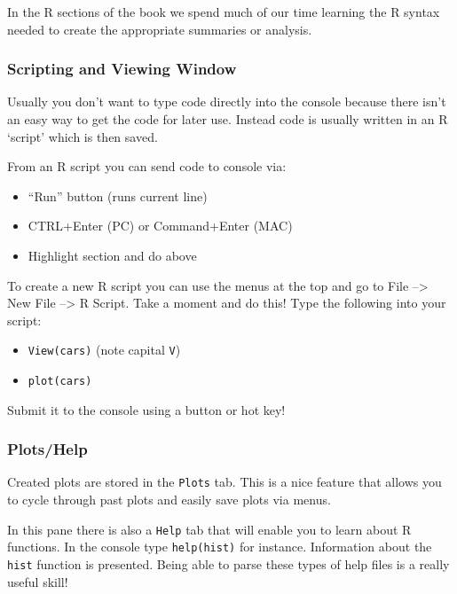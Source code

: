 \documentclass[
]{book}
\theoremstyle{definition}
\theoremstyle{definition}
\theoremstyle{definition}
\theoremstyle{remark}
\begin{document}
In the R sections of the book we spend much of our time learning the R syntax needed to create the appropriate summaries or analysis.

\hypertarget{scripting-and-viewing-window-1}{%
\subsubsection{Scripting and Viewing Window}\label{scripting-and-viewing-window-1}}

Usually you don't want to type code directly into the console because there isn't an easy way to get the code for later use. Instead code is usually written in an R `script' which is then saved.

From an R script you can send code to console via:

\begin{itemize}
\item
  ``Run'' button (runs current line)
\item
  CTRL+Enter (PC) or Command+Enter (MAC)
\item
  Highlight section and do above
\end{itemize}

To create a new R script you can use the menus at the top and go to File --\textgreater{} New File --\textgreater{} R Script. Take a moment and do this! Type the following into your script:

\begin{itemize}
\item
  \texttt{View(cars)} (note capital \texttt{V})
\item
  \texttt{plot(cars)}
\end{itemize}

Submit it to the console using a button or hot key!

\hypertarget{plotshelp-1}{%
\subsubsection{Plots/Help}\label{plotshelp-1}}

Created plots are stored in the \texttt{Plots} tab. This is a nice feature that allows you to cycle through past plots and easily save plots via menus.

In this pane there is also a \texttt{Help} tab that will enable you to learn about R functions. In the console type \texttt{help(hist)} for instance. Information about the \texttt{hist} function is presented. Being able to parse these types of help files is a really useful skill!
\end{document}
